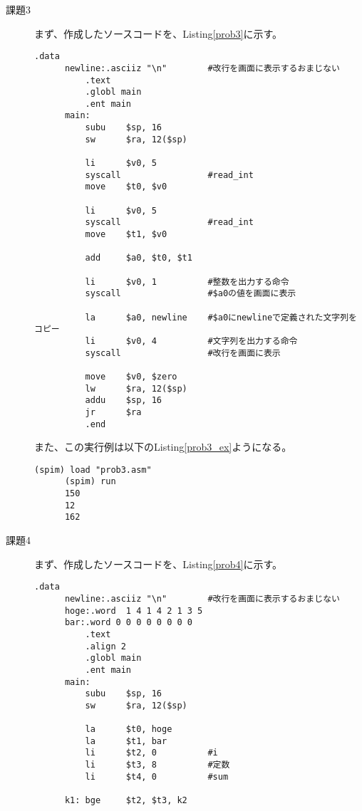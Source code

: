 \documentclass{jsarticle}
\begin{document}
\begin{description}
      \item[課題3]
      まず、作成したソースコードを、Listing\ref{prob3}に示す。
      \begin{lstlisting}[caption=課題3のソースコード, label=prob3]
          .data
      newline:.asciiz "\n"        #改行を画面に表示するおまじない
          .text
          .globl main
          .ent main
      main:
          subu    $sp, 16
          sw      $ra, 12($sp)

          li      $v0, 5
          syscall                 #read_int
          move    $t0, $v0

          li      $v0, 5
          syscall                 #read_int
          move    $t1, $v0

          add     $a0, $t0, $t1

          li      $v0, 1          #整数を出力する命令
          syscall                 #$a0の値を画面に表示

          la      $a0, newline    #$a0にnewlineで定義された文字列をコピー
          li      $v0, 4          #文字列を出力する命令
          syscall                 #改行を画面に表示

          move    $v0, $zero
          lw      $ra, 12($sp)
          addu    $sp, 16
          jr      $ra
          .end
      \end{lstlisting}
      また、この実行例は以下のListing\ref{prob3_ex}ようになる。
      \begin{lstlisting}[caption=課題3の実行例, label=prob3_ex]
      (spim) load "prob3.asm"
      (spim) run
      150
      12
      162
      \end{lstlisting}



      \item[課題4]
      まず、作成したソースコードを、Listing\ref{prob4}に示す。
      \begin{lstlisting}[caption=課題4のソースコード, label=prob4]
          .data
      newline:.asciiz "\n"        #改行を画面に表示するおまじない
      hoge:.word  1 4 1 4 2 1 3 5
      bar:.word 0 0 0 0 0 0 0 0
          .text
          .align 2
          .globl main
          .ent main
      main:
          subu    $sp, 16
          sw      $ra, 12($sp)

          la      $t0, hoge
          la      $t1, bar
          li      $t2, 0          #i
          li      $t3, 8          #定数
          li      $t4, 0          #sum

      k1: bge     $t2, $t3, k2


\end{lstlisting}
\end{description}
\end{document}
